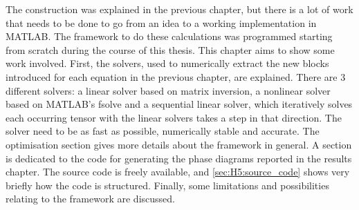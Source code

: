 The construction was explained in the previous chapter, but there is a lot of work that needs to be done to go from an idea to a working implementation in MATLAB. The framework to do these calculations was programmed starting from scratch during the course of this thesis. This chapter aims to show some work involved. First, the solvers, used to numerically extract the new blocks introduced for each equation in the previous chapter, are explained. There are 3 different solvers: a linear solver based on matrix inversion, a nonlinear solver based on MATLAB's fsolve and a sequential linear solver, which iteratively solves each occurring tensor with the linear solvers takes a step in that direction. The solver need to be as fast as possible, numerically stable and accurate. The optimisation section gives more details about the framework in general. A section is dedicated to the code for generating the phase diagrams reported in the results chapter.  The source code is freely available, and \cref{sec:H5:source_code} shows very briefly how the code is structured. Finally, some limitations and possibilities relating to the framework are discussed.